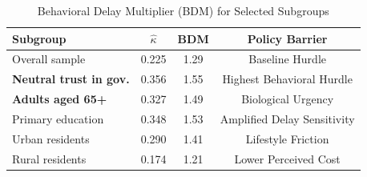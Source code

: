 \begin{table}
\centering
\small
\begin{tabular}{lccc}
\toprule
\textbf{Subgroup} & $\hat{\kappa}$ & \textbf{BDM} & \textbf{Policy Barrier} \\
\midrule
Overall sample & 0.225 & 1.29 & Baseline Hurdle \\
\textbf{Neutral trust in gov.} & \alert{0.356} & \alert{1.55} & \alert{Highest Behavioral Hurdle} \\
\textbf{Adults aged 65+} & \alert{0.327} & \alert{1.49} & \alert{Biological Urgency} \\
Primary education & 0.348 & 1.53 & Amplified Delay Sensitivity \\
Urban residents & 0.290 & 1.41 & Lifestyle Friction \\
Rural residents & 0.174 & 1.21 & Lower Perceived Cost \\
\bottomrule
\end{tabular}
\caption{Behavioral Delay Multiplier (BDM) for Selected Subgroups}
\end{table}
